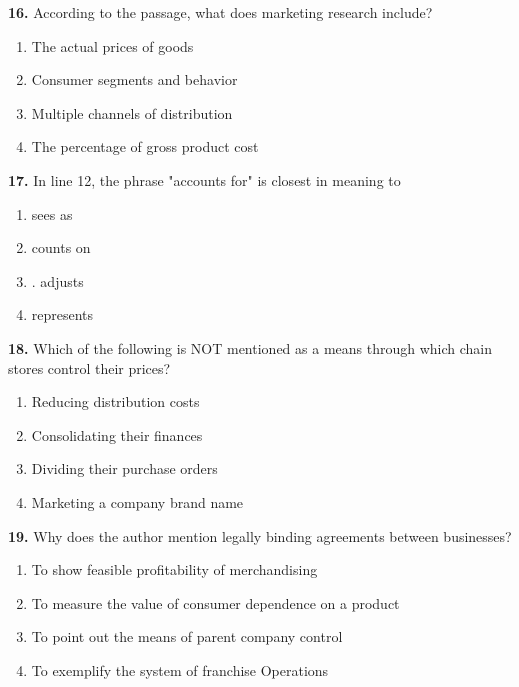 \documentclass[12pt]{article}
\begin{document}
\par
\vspace{0.25\baselineskip}
\noindent\textbf{16.} According to the passage, what does marketing research include?
\begin{enumerate}[label=(\Alph*),leftmargin=*,itemsep=0.2em]
\item The actual prices of goods
\item Consumer segments and behavior
\item Multiple channels of distribution
\item The percentage of gross product cost
\end{enumerate}
\par
\vspace{0.25\baselineskip}
\noindent\textbf{17.} In line 12, the phrase "accounts for" is closest in meaning to
\begin{enumerate}[label=(\Alph*),leftmargin=*,itemsep=0.2em]
\item sees as
\item counts on
\item . adjusts
\item represents
\end{enumerate}
\par
\vspace{0.25\baselineskip}
\noindent\textbf{18.} Which of the following is NOT mentioned as a means through which chain stores control their prices?
\begin{enumerate}[label=(\Alph*),leftmargin=*,itemsep=0.2em]
\item Reducing distribution costs
\item Consolidating their finances
\item Dividing their purchase orders
\item Marketing a company brand name
\end{enumerate}
\par
\vspace{0.25\baselineskip}
\noindent\textbf{19.} Why does the author mention legally binding agreements between businesses?
\begin{enumerate}[label=(\Alph*),leftmargin=*,itemsep=0.2em]
\item To show feasible profitability of merchandising
\item To measure the value of consumer dependence on a product
\item To point out the means of parent company control
\item To exemplify the system of franchise Operations
\end{enumerate}
\end{document}
